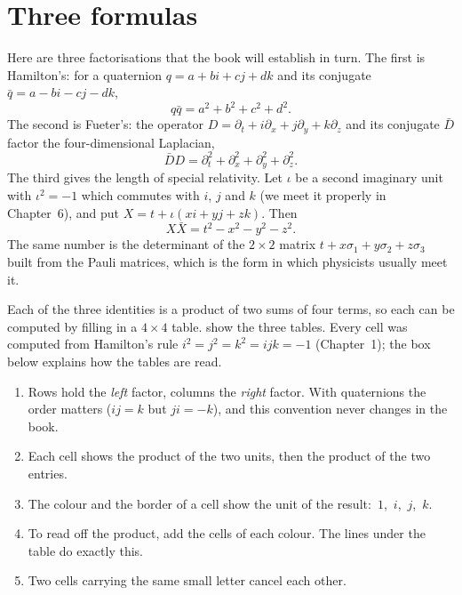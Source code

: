 \section{Three formulas}

Here are three factorisations that the book will establish in turn. The first is Hamilton's: for a quaternion $q=a+bi+cj+dk$ and its conjugate $\bar q=a-bi-cj-dk$,
\begin{equation}\label{eq:pro-qqbar}
  q\bar q=a^2+b^2+c^2+d^2 .
\end{equation}
The second is Fueter's: the operator $D=\partial_t+i\partial_x+j\partial_y+k\partial_z$ and its conjugate $\bar D$ factor the four-dimensional Laplacian,
\begin{equation}\label{eq:pro-dbard}
  \bar D D=\partial_t^2+\partial_x^2+\partial_y^2+\partial_z^2 .
\end{equation}
The third gives the length of special relativity. Let $\iota$ be a second imaginary unit with $\iota^2=-1$ which commutes with $i$, $j$ and $k$ (we meet it properly in Chapter~6), and put $X=t+\iota(xi+yj+zk)$. Then
\begin{equation}\label{eq:pro-mink}
  X\bar X=t^2-x^2-y^2-z^2 .
\end{equation}
The same number is the determinant of the $2\times2$ matrix $t+x\sigma_1+y\sigma_2+z\sigma_3$ built from the Pauli matrices, which is the form in which physicists usually meet it.

Each of the three identities is a product of two sums of four terms, so each can be computed by filling in a $4\times4$ table.  show the three tables. Every cell was computed from Hamilton's rule $i^2=j^2=k^2=ijk=-1$ (Chapter~1); the box below explains how the tables are read.

\begin{tableread}
\begin{enumerate}[leftmargin=1.4em,itemsep=0.2ex,topsep=0.2ex]
\item Rows hold the \emph{left} factor, columns the \emph{right} factor. With quaternions the order matters ($ij=k$ but $ji=-k$), and this convention never changes in the book.
\item Each cell shows the product of the two units, then the product of the two entries.
\item The colour and the border of a cell show the unit of the result: \,$1$, \,$i$, \,$j$, \,$k$.
\item To read off the product, add the cells of each colour. The lines under the table do exactly this.
\item Two cells carrying the same small letter cancel each other.
\end{enumerate}
\end{tableread}

